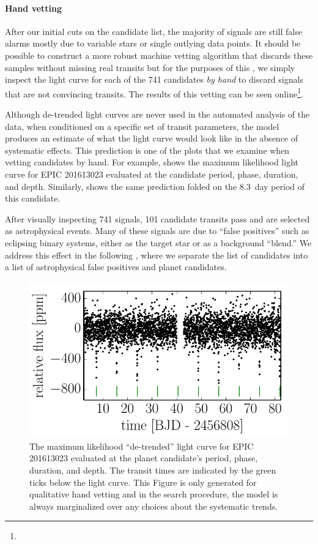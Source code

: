 \paragraph{Hand vetting}

After our initial cuts on the candidate list, the majority of signals are
still false alarms mostly due to variable stars or single outlying data
points.
It should be possible to construct a more robust machine vetting algorithm
that discards these samples without missing real transits but for the purposes
of this \paper, we simply inspect the light curve for each of the 741
candidates \emph{by hand} to discard signals that are not convincing transits.
The results of this vetting can be seen online\footnote{\datareleaseurl}.

Although de-trended light curves are never used in the automated analysis of
the data, when conditioned on a specific set of transit parameters, the model
produces an estimate of what the light curve would look like in the absence
of systematic effects.
This prediction is one of the plots that we examine when vetting candidates
by hand.
For example,  shows the maximum likelihood light curve for
EPIC 201613023 evaluated at the candidate period, phase, duration, and depth.
Similarly,  shows the same prediction folded on the 8.3~day
period of this candidate.

After visually inspecting 741 signals, 101 candidate transits pass and are
selected as astrophysical events.
Many of these signals are due to ``false positives'' such as eclipsing binary
systems, either as the target star or as a background ``blend.'' We address
this effect in the following \sectionname, where we separate the list of
candidates into a list of astrophysical false positives and planet candidates.

\begin{figure}[p]
\begin{center}
\includegraphics{figures/ketu/de-trended.pdf}
\end{center}
\caption{%
The maximum likelihood ``de-trended'' light curve for EPIC 201613023
evaluated at the planet candidate's period, phase, duration, and depth.
The transit times are indicated by the green ticks below the light curve.
This Figure is only generated for qualitative hand vetting and in the search
procedure, the model is always marginalized over any choices about the
systematic trends.
}
\end{figure}

